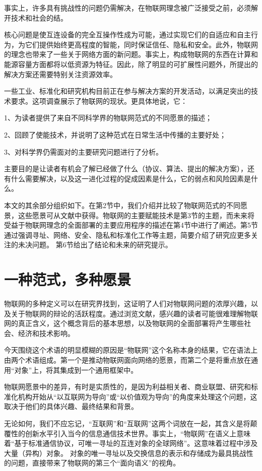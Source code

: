 \documentclass[12pt,a4paper]{article}%
\begin{document}
事实上，许多具有挑战性的问题仍需解决，在物联网理念被广泛接受之前，必须解开技术和社会的结。

核心问题是使互连设备的完全互操作性成为可能，通过实现它们的自适应和自主行为，为它们提供始终更高程度的智能，同时保证信任、隐私和安全。此外，物联网的理念也带来了一些关于网络方面的新问题。事实上，构成物联网的东西在计算和能源容量方面都将以低资源为特征。因此，除了明显的可扩展性问题外，所提出的解决方案还需要特别关注资源效率。

一些工业、标准化和研究机构目前正在参与解决方案的开发活动，以满足突出的技术要求。这项调查展示了物联网的现状。更具体地说，它：

1、为读者提供了来自不同科学界的物联网范式的不同愿景的描述；

2、回顾了使能技术，并说明了这种范式在日常生活中传播的主要好处；

3、对科学界仍需面对的主要研究问题进行了分析。

主要目的是让读者有机会了解已经做了什么（协议、算法、提出的解决方案），还有什么需要解决，以及这一进化过程的促成因素是什么，它的弱点和风险因素是什么。

本文的其余部分组织如下。在第2节中，我们介绍并比较了物联网范式的不同愿景，这些愿景可从文献中获得。物联网的主要赋能技术是第3节的主题，而未来将受益于物联网理念的全面部署的主要应用程序的描述在第4节中进行了阐述。第5节通过强调寻址、网络、安全、隐私和标准化工作等主题，简要介绍了研究应更多关注的未决问题。
第6节给出了结论和未来的研究提示。

\section{一种范式，多种愿景}
物联网的多种定义可以在研究界找到，这证明了人们对物联网问题的浓厚兴趣，以及关于物联网的辩论的活跃程度。通过浏览文献，感兴趣的读者可能很难理解物联网的真正含义，这个概念背后的基本思想，以及物联网的全面部署将产生哪些社会、经济和技术影响。

今天围绕这个术语的明显模糊的原因是“物联网”这个名称本身的结果，它在语法上由两个术语组成。第一个是推动物联网面向网络的愿景，而第二个是将重点放在通用“对象”上，将其集成到一个通用框架中。

物联网愿景中的差异，有时是实质性的，是因为利益相关者、商业联盟、研究和标准化机构开始从“以互联网为导向”或“以价值观为导向”的角度来处理这个问题，这取决于他们的具体兴趣、最终结果和背景。

无论如何，我们不应忘记，“互联网”和“互联网”这两个词放在一起，其含义是将颠覆性的创新水平引入当今的信息通信技术世界。事实上，“物联网”在语义上意味着“基于标准通信协议，可唯一寻址的互连对象的全球网络”。这意味着过程中涉及大量（异构）对象。
对象的唯一寻址以及交换信息的表示和存储成为最具挑战性的问题，直接带来了物联网的第三个“面向语义”的视角。
\end{document}
